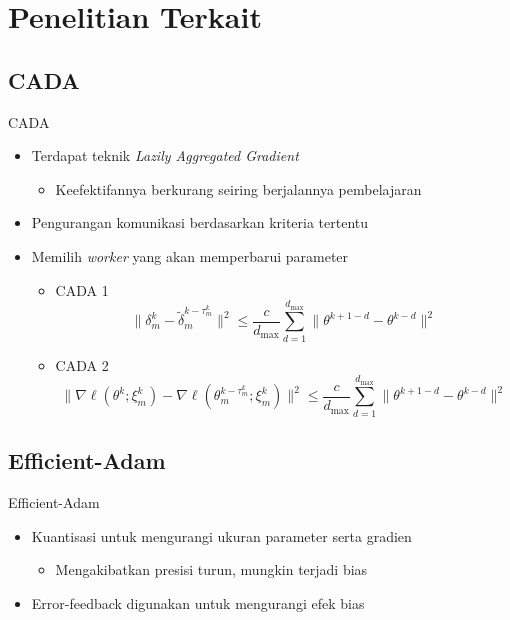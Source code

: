\documentclass[aspectratio=169]{beamer}
\begin{document}
\section{Penelitian Terkait}
\subsection{CADA}
\begin{frame}{CADA \parencite{Chen2021CADA}}
  \begin{itemize}
    \item Terdapat teknik \textit{Lazily Aggregated Gradient} \parencite{Chen2018LAG}
          \begin{itemize}
            \item Keefektifannya berkurang seiring berjalannya pembelajaran
          \end{itemize}
    \item Pengurangan komunikasi berdasarkan kriteria tertentu
    \item Memilih \textit{worker} yang akan memperbarui parameter
          \begin{itemize}
            \item CADA 1
                  \begin{equation*}
                    \| \delta_m^k - \tilde{\delta}_m^{k-\tau_m^k} \|^2 \le \frac{c}{d_{\mathrm{max}}}\sum_{d=1}^{d_{\mathrm{max}}}\| \theta^{k+1-d} - \theta^{k-d} \|^2
                  \end{equation*}
            \item CADA 2
                  \begin{equation*}
                    \| \nabla \ell (\theta^k; \xi_m^k) - \nabla \ell (\theta_m^{k-\tau_m^k}; \xi_m^k) \|^2 \le \frac{c}{d_{\mathrm{max}}} \sum_{d=1}^{d_{\mathrm{max}}} \| \theta^{k+1-d} - \theta^{k-d} \|^2
                  \end{equation*}
          \end{itemize}
  \end{itemize}
\end{frame}

\subsection{Efficient-Adam}
\begin{frame}{Efficient-Adam \parencite{Chen2022Efficient}}
  \begin{itemize}
    \item Kuantisasi untuk mengurangi ukuran parameter serta gradien
          \begin{itemize}
            \item Mengakibatkan presisi turun, mungkin terjadi bias
          \end{itemize}
    \item Error-feedback digunakan untuk mengurangi efek bias
  \end{itemize}
\end{frame}
\end{document}
